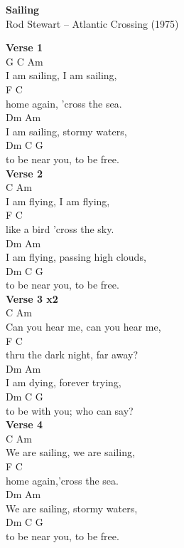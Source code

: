 \documentclass[a4paper]{article}
\begin{document}
    \begin{center}
        \textbf{Sailing}
        ~\\
        Rod Stewart -- Atlantic Crossing (1975)
    \end{center}
    {
        \scriptsize
        \textbf{Verse 1}
        ~\\
        {
            \cutive
            \obeyspaces
G    C             Am
\\
I am sailing, I am sailing,
\\
     F                 C
\\
home again, 'cross the sea.
\\
     Dm              Am
\\
I am sailing, stormy waters,
\\
      Dm               C      G
\\
to be near you,  to be free.
\\

        }
        \textbf{Verse 2}
        ~\\
        {
            \cutive
            \obeyspaces
     C            Am
\\
I am flying, I am flying,
\\
       F               C
\\
like a bird 'cross the sky.
\\
     Dm              Am
\\
I am flying, passing high clouds,
\\
      Dm              C      G
\\
to be near you, to be free.
\\

        }
        \textbf{Verse 3 x2}
        ~\\
        {
            \cutive
            \obeyspaces
        C                Am
\\
Can you hear me, can you hear me,
\\
         F               C
\\
thru the dark night, far away?
\\
     Dm             Am
\\
I am dying, forever trying,
\\
      Dm                 C      G
\\
to be with you;  who can say?
\\

        }
        \textbf{Verse 4}
        ~\\
        {
            \cutive
            \obeyspaces
       C               Am
\\
We are sailing, we are sailing,
\\
     F                C
\\
home again,'cross the sea.
\\
       Dm              Am
\\
We are sailing, stormy waters,
\\
      Dm              C      G
\\
to be near you, to be free.
\\

}}
\end{document}
